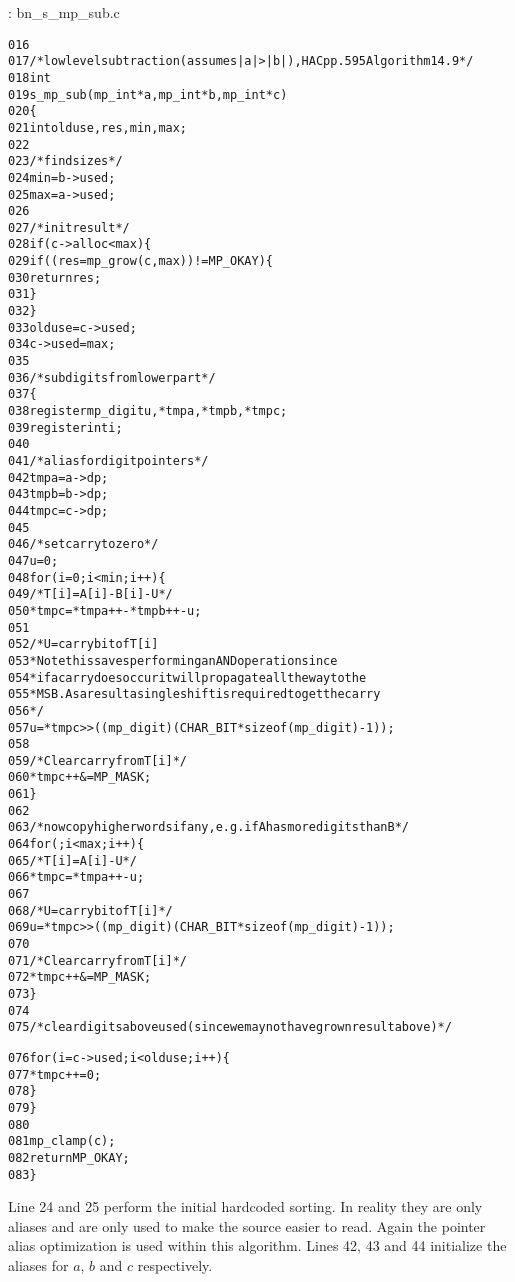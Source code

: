 \documentclass[b5paper]{book}
\begin{document}
\vspace{+3mm}\begin{small}
\hspace{-5.1mm}{\bf File}: bn\_s\_mp\_sub.c
\vspace{-3mm}
\begin{alltt}
016   
017   /* low level subtraction (assumes |a| > |b|), HAC pp.595 Algorithm 14.9 */
018   int
019   s_mp_sub (mp_int * a, mp_int * b, mp_int * c)
020   \{
021     int     olduse, res, min, max;
022   
023     /* find sizes */
024     min = b->used;
025     max = a->used;
026   
027     /* init result */
028     if (c->alloc < max) \{
029       if ((res = mp_grow (c, max)) != MP_OKAY) \{
030         return res;
031       \}
032     \}
033     olduse = c->used;
034     c->used = max;
035   
036     /* sub digits from lower part */
037     \{
038       register mp_digit u, *tmpa, *tmpb, *tmpc;
039       register int i;
040   
041       /* alias for digit pointers */
042       tmpa = a->dp;
043       tmpb = b->dp;
044       tmpc = c->dp;
045   
046       /* set carry to zero */
047       u = 0;
048       for (i = 0; i < min; i++) \{
049         /* T[i] = A[i] - B[i] - U */
050         *tmpc = *tmpa++ - *tmpb++ - u;
051   
052         /* U = carry bit of T[i]
053          * Note this saves performing an AND operation since
054          * if a carry does occur it will propagate all the way to the
055          * MSB.  As a result a single shift is required to get the carry
056          */
057         u = *tmpc >> ((mp_digit)(CHAR_BIT * sizeof (mp_digit) - 1));
058   
059         /* Clear carry from T[i] */
060         *tmpc++ &= MP_MASK;
061       \}
062   
063       /* now copy higher words if any, e.g. if A has more digits than B  */
064       for (; i < max; i++) \{
065         /* T[i] = A[i] - U */
066         *tmpc = *tmpa++ - u;
067   
068         /* U = carry bit of T[i] */
069         u = *tmpc >> ((mp_digit)(CHAR_BIT * sizeof (mp_digit) - 1));
070   
071         /* Clear carry from T[i] */
072         *tmpc++ &= MP_MASK;
073       \}
074   
075       /* clear digits above used (since we may not have grown result above) */
      
076       for (i = c->used; i < olduse; i++) \{
077         *tmpc++ = 0;
078       \}
079     \}
080   
081     mp_clamp (c);
082     return MP_OKAY;
083   \}
\end{alltt}
\end{small}

Line 24 and 25 perform the initial hardcoded sorting.  In reality they are only aliases and are only used to make the source easier to 
read.  Again the pointer alias optimization is used within this algorithm.  Lines 42, 43 and 44 initialize the aliases for 
$a$, $b$ and $c$ respectively.
\end{document}
